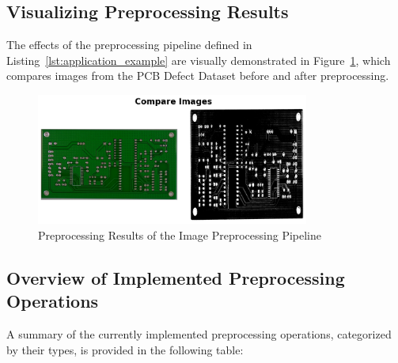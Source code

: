 \documentclass[journal]{new-aiaa}
\begin{document}
\subsection{Visualizing Preprocessing Results}
The effects of the preprocessing pipeline defined in Listing~\ref{lst:application_example} are visually demonstrated in Figure~\ref{fig:preprocessing_results}, which compares images from the PCB Defect Dataset before and after preprocessing.\cite{ding2019tddnet}

\begin{figure}[h]
	\centering
	\includegraphics[width=0.8\textwidth]{preprocessing_results.png}
	\caption{Preprocessing Results of the Image Preprocessing Pipeline}
	\label{fig:preprocessing_results}
\end{figure}

\subsection{Overview of Implemented Preprocessing Operations}
A summary of the currently implemented preprocessing operations, categorized by their types, is provided in the following table:
\end{document}

